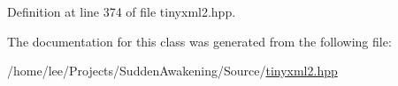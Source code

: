Definition at line 374 of file tinyxml2.\-hpp.



The documentation for this class was generated from the following file\-:\begin{DoxyCompactItemize}
\item 
/home/lee/\-Projects/\-Sudden\-Awakening/\-Source/\hyperlink{tinyxml2_8hpp}{tinyxml2.\-hpp}\end{DoxyCompactItemize}
